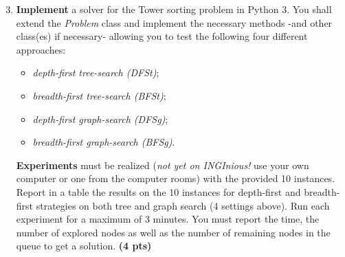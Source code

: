 \documentclass[11pt,a4paper]{report}
\begin{document}
\begin{enumerate}
\setcounter{enumi}{2}
    \item \textbf{Implement} a solver for the Tower sorting problem in Python 3.
    You shall extend the \emph{Problem} class and implement the necessary methods -and other class(es) if necessary- allowing you to test the following four different approaches: 
    \begin{itemize}
    	\item \textit{depth-first tree-search (DFSt)};
    	\item \textit{breadth-first tree-search (BFSt)};
    	\item \textit{depth-first graph-search (DFSg)};
    	\item \textit{breadth-first graph-search (BFSg)}. 
    \end{itemize}
    \textbf{Experiments} must be realized (\textit{not yet on INGInious!} use your own computer or one from the computer rooms) with the provided 10 instances. 
    Report in a table the results on the 10 instances for depth-first and breadth-first strategies on both tree and graph search (4 settings above). 
    Run each experiment for a maximum of 3 minutes. 
    You must report the time, the number of explored nodes as well as the number of remaining nodes in the queue to get a solution. \textbf{(4 pts)}
\end{enumerate}
\end{document}
